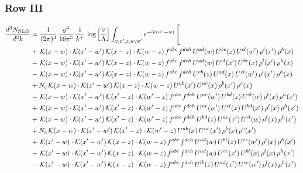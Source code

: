 \documentclass[9pt]{article}
\numberwithin{equation}{section}
\begin{document}
 \subsubsection{Row III}
 \begin{align}
\frac{d^{3}N_{\mathrm{NLO}}}{d^{3}k} & = \frac{1}{(2\pi)^{3}}\,\frac{g^{4}}{16\pi^{5}}\,\frac{1}{k^{+}}\,\log\Big[\frac{\vee}{\Lambda}\Big]\int_{x,x',z,w,w'}e^{-ik(w'-w)}\,\Bigg[\notag\\ &  +\,\mathcal{K}(x-w)\cdot\mathcal{K}(x'-w')\,\mathcal{K}(x-z)\cdot\mathcal{K}(w-z)\,f^{abc}\,f^{deh}\,U^{ad}(w)\,U^{be}(z)\,U^{cl}(w')\,\rho^{l}(x')\,\rho^{h}(x)\notag\\
& -\,\mathcal{K}(x-w)\cdot\mathcal{K}(x'-w')\,\mathcal{K}(x-z)\cdot\mathcal{K}(w-z)\,f^{abc}\,f^{deh}\,U^{ad}(w)\,U^{cl}(x')\,U^{be}(x)\,\rho^{l}(x')\,\rho^{h}(x)\notag\\
& -\,\mathcal{K}(x-w)\cdot\mathcal{K}(x'-w')\,\mathcal{K}(x-z)\cdot\mathcal{K}(w-z)\,f^{abc}\,f^{deh}\,U^{eb}(z)\,U^{ad}(x)\,U^{cl}(w')\,\rho^{l}(x')\,\rho^{h}(x)\notag\\
& +N_{c}\,\mathcal{K}(x-w)\cdot\mathcal{K}(x'-w')\,\mathcal{K}(x-z)\cdot\mathcal{K}(w-z)\,U^{ab}(x')\,U^{ac}(x)\,\rho^{b}(x')\,\rho^{c}(x)\notag\\
& -\,\mathcal{K}(x-w)\cdot\mathcal{K}(x'-w')\,\mathcal{K}(x'-z)\cdot\mathcal{K}(w'-z)\,f^{abc}\,f^{deh}\,U^{ae}(w')\,U^{bd}(z)\,U^{cl}(w)\,\rho^{l}(x)\,\rho^{h}(x')\notag\\
& +\,\mathcal{K}(x-w)\cdot\mathcal{K}(x'-w')\,\mathcal{K}(x'-z)\cdot\mathcal{K}(w'-z)\,f^{abc}\,f^{deh}\,U^{ae}(w')\,U^{cl}(x)\,U^{bd}(x')\,\rho^{l}(x)\,\rho^{h}(x')\notag\\
& +\,\mathcal{K}(x-w)\cdot\mathcal{K}(x'-w')\,\mathcal{K}(x'-z)\cdot\mathcal{K}(w'-z)\,f^{abc}\,f^{deh}\,U^{bd}(z)\,U^{ae}(x')\,U^{cl}(w)\,\rho^{l}(x)\,\rho^{h}(x')\notag\\
& +N_{c}\,\mathcal{K}(x-w)\cdot\mathcal{K}(x'-w')\,\mathcal{K}(x'-z)\cdot\mathcal{K}(w'-z)\,U^{ab}(x)\,U^{ac}(x')\,\rho^{b}(x)\,\rho^{c}(x')\notag\\
& +\,\mathcal{K}(x'-w)\cdot\mathcal{K}(x'-w')\,\mathcal{K}(x-z)\cdot\mathcal{K}(w-z)\,f^{abc}\,f^{deh}\,U^{ad}(w)\,U^{bl}(z)\,U^{ce}(w')\,\rho^{l}(x)\,\rho^{h}(x')\notag\\
& -\,\mathcal{K}(x'-w)\cdot\mathcal{K}(x'-w')\,\mathcal{K}(x-z)\cdot\mathcal{K}(w-z)\,f^{abc}\,f^{deh}\,U^{ad}(w)\,U^{ce}(x')\,U^{bl}(x)\,\rho^{l}(x)\,\rho^{h}(x')\notag\\
& -\,\mathcal{K}(x'-w)\cdot\mathcal{K}(x'-w')\,\mathcal{K}(x-z)\cdot\mathcal{K}(w-z)\,f^{abc}\,f^{deh}\,U^{lb}(z)\,U^{ad}(x')\,U^{ce}(w')\,\rho^{l}(x)\,\rho^{h}(x')\notag\\

\end{align}
\end{document}
